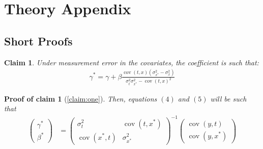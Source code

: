 \documentclass[10pt]{article}
\newtheorem{claim}{Claim}
\newtheorem{claimproof}{Proof of claim}[claim]
\begin{document}
    \appendix

	\section*{Theory Appendix}
	\subsection*{Short Proofs}

\setcounter{claim}{0}
\setcounter{claimproof}{0}

	\begin{claim}
	Under measurement error in the covariates, the coefficient is such that:
	\begin{align}
            \gamma^* = \gamma + \beta\frac{\operatorname{cov}(t,x)(\sigma^2_{x^*}-\sigma^2_x)}{\sigma_{t}^2\sigma_{x^*}^2-\operatorname{cov}({t,x})^2}
        \end{align}
	\end{claim}
	
\begin{claimproof}[\ref{claim:one}]

Then, equations $(4)$ and $(5)$ will be such that
            \begin{align}
                    \left(\begin{array}{l}
                {\gamma}^* \\
                {\beta}^*
                \end{array}\right)&=\left(\begin{array}{cc}
                {\sigma}^2_{t} & \operatorname{cov}({t,x^*}) \\
                \operatorname{cov}({x^*,t}) & {\sigma}_{x^*}^2
                \end{array}\right)^{-1}\left(\begin{array}{c}
                \operatorname{cov}{(y,t)} \\
                \operatorname{cov}{(y,x^*)}
                \end{array}\right) \\
                \end{align}
           
\end{claimproof}	
 
\end{document}
